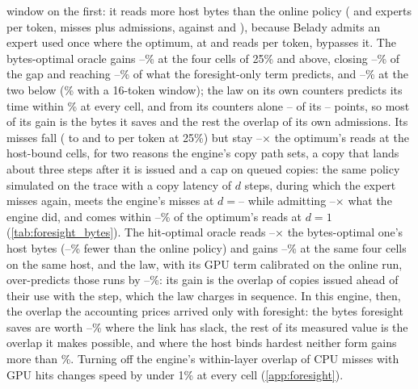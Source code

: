 window on the first: it reads more host bytes than the online policy (\fsmReadsOracleGLow{} and
\fsmReadsOracleQLow{} experts per token, misses plus admissions, against \fsmReadsBaseGLow{} and \fsmReadsBaseQLow),
because Belady admits an expert used once where the optimum, at \fsmReadsOptGLow{} and \fsmReadsOptQLow{} reads per
token, bypasses it. The bytes-optimal oracle gains \fsbGainHighMin--\fsbGainHighMax\% at the four cells of 25\% and
above, closing \fsbClosedHighMin--\fsbClosedHighMax\% of the gap and reaching \fsbRecovHighMin--\fsbRecovHighMax\% of
what the foresight-only term predicts, and \fsbGainLowMin--\fsbGainLowMax\% at the two below
(\fsbGainLowMaxAny\% with a 16-token window); the law on its own counters predicts its time within \fsbLawErrMax\%
at every cell, and from its counters alone \fsbLawGainHighMin--\fsbLawGainHighMax{} of its
\fsbGainHighMin--\fsbGainHighMax{} points, so most of its gain is the bytes it saves and the rest the overlap of its
own admissions. Its misses fall (\fsbMissesBaseGMid{} to \fsbMissesGMid{} and \fsbMissesBaseQMid{} to
\fsbMissesQMid{} per token at 25\%) but stay \fsbReadsRatioHostMin--\fsbReadsRatioHostMax$\times$ the optimum's
reads at the host-bound cells, for two reasons the engine's copy path sets, a copy that lands about three steps
after it is issued and a cap on queued copies: the same policy simulated on the trace with a copy latency of $d$
steps, during which the expert misses again, meets the engine's misses at $d{=}$\fslFitHostMin--\fslFitHostMax{}
while admitting \fsbSimAdmitMin--\fsbSimAdmitMax$\times$ what the engine did, and comes within
\fslIdealOverMin--\fslIdealOverMax\% of the optimum's reads at $d{=}1$ (\cref{tab:foresight_bytes}). The hit-optimal oracle reads \fspVsBypassBytesMin--\fspVsBypassBytesMax$\times$
the bytes-optimal one's host bytes (\fspBytesFewerMin--\fspBytesFewerMax\% fewer than the online policy) and gains
\fspGainHighMin--\fspGainHighMax\% at the same four cells on the same host, and the law, with its GPU term calibrated
on the online run, over-predicts those runs by \fspLawErrHighMin--\fspLawErrHighMax\%: its gain is the overlap of
copies issued ahead of their use with the step, which the law charges in sequence. In this engine, then, the overlap
the accounting prices arrived only with foresight: the bytes foresight saves are worth
\fsbGainHighMin--\fsbGainHighMax\% where the link has slack, the rest of its measured value is the overlap it makes
possible, and where the host binds hardest neither form gains more than \fsbGainLowMaxAny\%. Turning off the
engine's within-layer overlap of CPU misses with GPU hits changes speed by under 1\% at every cell
(\cref{app:foresight}).
